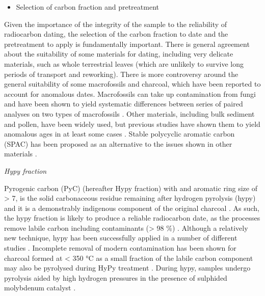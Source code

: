 \documentclass[
  12pt,
]{book}
\providecommand{\tightlist}{%
  \setlength{\itemsep}{0pt}\setlength{\parskip}{0pt}}
\begin{document}
\begin{itemize}
\tightlist
\item
  Selection of carbon fraction and pretreatment
\end{itemize}

Given the importance of the integrity of the sample to the reliability of radiocarbon dating, the selection of the carbon fraction to date and the pretreatment to apply is fundamentally important. There is general agreement about the suitability of some materials for dating, including very delicate materials, such as whole terrestrial leaves (which are unlikely to survive long periods of transport and reworking). There is more controversy around the general suitability of some macrofossils and charcoal, which have been reported to account for anomalous dates. Macrofossils can take up contamination from fungi \citep{wohlfarthPitfallsAMSRadiocarbondating1998} and have been shown to yield systematic differences between series of paired analyses on two types of macrofossils \citep{turneyImplicationsDatingWisconsinan2000}. Other materials, including bulk sediment and pollen, have been widely used, but previous studies have shown them to yield anomalous ages in at least some cases \citep{wangRadiocarbonDatingSoil1996}. Stable polycyclic aromatic carbon (SPAC) has been proposed as an alternative to the issues shown in other materials \citep{fieldUntanglingGeochronologicalComplexity2018, orrImprovedPretreatmentMethod2020}.

\emph{Hypy fraction}

Pyrogenic carbon (PyC) (hereafter Hypy fraction) with and aromatic ring size of \textgreater{} 7, is the solid carbonaceous residue remaining after hydrogen pyrolysis (hypy) and it is a demonstrably indigenous component of the original charcoal \citep{meredithAssessmentHydropyrolysisMethod2012}. As such, the hypy fraction is likely to produce a reliable radiocarbon date, as the processes remove labile carbon including contaminants (\textgreater{} 98 \%) \citep{orrImprovedPretreatmentMethod2020}. Although a relatively new technique, hypy has been successfully applied in a number of different studies \citep{birdEfficiencyCharcoalDecontamination2014, fieldCoherentPatternsEnvironmental2018}. Incomplete removal of modern contamination has been shown for charcoal formed at \textless{} 350 °C as a small fraction of the labile carbon component may also be pyrolysed during HyPy treatment \citep{birdEfficiencyCharcoalDecontamination2014}. During hypy, samples undergo pyrolysis aided by high hydrogen pressures in the presence of sulphided molybdenum catalyst \citep{ascoughHydropyrolysisNewTool2009, ascoughHydropyrolysisImplicationsRadiocarbon2010, wursterQuantifyingAbundanceStable2012}.
\end{document}

